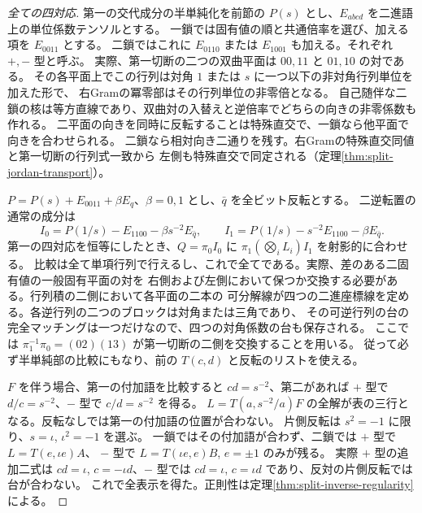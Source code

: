 \begin{proof}[全ての四対応]
第一の交代成分の半単純化を前節の $P(s)$ とし、$E_{abcd}$ を二進語上の単位係数テンソルとする。
一鎖では固有値の順と共通倍率を選び、加える項を $E_{0011}$ とする。
二鎖ではこれに $E_{0110}$ または $E_{1001}$ も加える。それぞれ $+,-$ 型と呼ぶ。
実際、第一切断の二つの双曲平面は $00,11$ と $01,10$ の対である。
その各平面上でこの行列は対角 $1$ または $s$ に一つ以下の非対角行列単位を加えた形で、
右Gramの冪零部はその行列単位の非零倍となる。
自己随伴な二鎖の核は等方直線であり、双曲対の入替えと逆倍率でどちらの向きの非零係数も作れる。
二平面の向きを同時に反転することは特殊直交で、一鎖なら他平面で向きを合わせられる。
二鎖なら相対向き二通りを残す。右Gramの特殊直交同値と第一切断の行列式一致から
左側も特殊直交で同定される（定理\ref{thm:split-jordan-transport}）。

$P=P(s)+E_{0011}+\beta E_q$、$\beta=0,1$ とし、$\bar q$ を全ビット反転とする。
二逆転置の通常の成分は
\[
 I_0=P(1/s)-E_{1100}-\beta s^{-2} E_{\bar q},\qquad
 I_1=P(1/s)-s^{-2}E_{1100}-\beta E_{\bar q}.
\]
第一の四対応を恒等にしたとき、$Q=\pi_0 I_0$ に $\pi_1(\bigotimes_i L_i)I_1$ を射影的に合わせる。
比較は全て単項行列で行えるし、これで全てである。実際、差のある二固有値の一般固有平面の対を
右側および左側において保つか交換する必要がある。行列積の二側において各平面の二本の
可分解線が四つの二進座標線を定める。各逆行列の二つのブロックは対角または三角であり、
その可逆行列の台の完全マッチングは一つだけなので、四つの対角係数の台も保存される。
ここでは $\pi_1^{-1}\pi_0=(02)(13)$ が第一切断の二側を交換することを用いる。
従って必ず半単純部の比較にもなり、前の $T(c,d)$ と反転のリストを使える。

$F$ を伴う場合、第一の付加語を比較すると $cd=s^{-2}$、第二があれば
$+$ 型で $d/c=s^{-2}$、$-$ 型で $c/d=s^{-2}$ を得る。
$L=T(a,s^{-2}/a)F$ の全解が表の三行となる。反転なしでは第一の付加語の位置が合わない。
片側反転は $s^2=-1$ に限り、$s=\iota$, $\iota^2=-1$ を選ぶ。
一鎖ではその付加語が合わず、二鎖では $+$ 型で $L=T(e,\iota e)A$、
$-$ 型で $L=T(\iota e,e)B$, $e=\pm1$ のみが残る。
実際 $+$ 型の追加二式は $cd=\iota$, $c=-\iota d$、$-$ 型では
$cd=\iota$, $c=\iota d$ であり、反対の片側反転では台が合わない。
これで全表示を得た。正則性は定理\ref{thm:split-inverse-regularity}による。
\end{proof}

